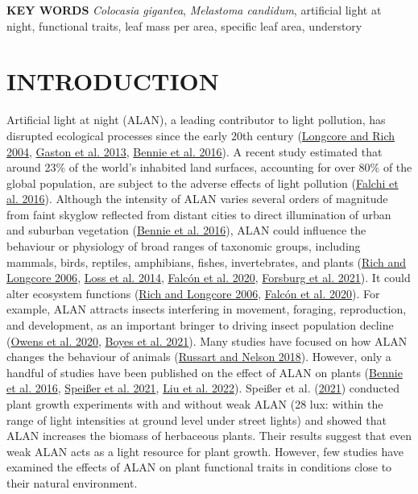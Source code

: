 \documentclass[
  12pt,
  letterpaper,
  DIV=11,
  numbers=noendperiod]{scrartcl}
\begin{document}
\textbf{KEY WORDS} \emph{Colocasia gigantea}, \emph{Melastoma candidum},
artificial light at night, functional traits, leaf mass per area,
specific leaf area, understory

\hypertarget{introduction}{%
\section{INTRODUCTION}\label{introduction}}

Artificial light at night (ALAN), a leading contributor to light
pollution, has disrupted ecological processes since the early 20th
century (\protect\hyperlink{ref-Longcore2004}{Longcore and Rich 2004},
\protect\hyperlink{ref-Gaston2013}{Gaston et al. 2013},
\protect\hyperlink{ref-Bennie2016}{Bennie et al. 2016}). A recent study
estimated that around 23\% of the world's inhabited land surfaces,
accounting for over 80\% of the global population, are subject to the
adverse effects of light pollution
(\protect\hyperlink{ref-Falchi2016a}{Falchi et al. 2016}). Although the
intensity of ALAN varies several orders of magnitude from faint skyglow
reflected from distant cities to direct illumination of urban and
suburban vegetation (\protect\hyperlink{ref-Bennie2016}{Bennie et al.
2016}), ALAN could influence the behaviour or physiology of broad ranges
of taxonomic groups, including mammals, birds, reptiles, amphibians,
fishes, invertebrates, and plants (\protect\hyperlink{ref-Rich2006}{Rich
and Longcore 2006}, \protect\hyperlink{ref-Loss2014}{Loss et al. 2014},
\protect\hyperlink{ref-Falcon2020}{Falcón et al. 2020},
\protect\hyperlink{ref-Forsburg2021}{Forsburg et al. 2021}). It could
alter ecosystem functions (\protect\hyperlink{ref-Rich2006}{Rich and
Longcore 2006}, \protect\hyperlink{ref-Falcon2020}{Falcón et al. 2020}).
For example, ALAN attracts insects interfering in movement, foraging,
reproduction, and development, as an important bringer to driving insect
population decline (\protect\hyperlink{ref-Owens2020}{Owens et al.
2020}, \protect\hyperlink{ref-Boyes2021}{Boyes et al. 2021}). Many
studies have focused on how ALAN changes the behaviour of animals
(\protect\hyperlink{ref-Russart2018}{Russart and Nelson 2018}). However,
only a handful of studies have been published on the effect of ALAN on
plants (\protect\hyperlink{ref-Bennie2016}{Bennie et al. 2016},
\protect\hyperlink{ref-Speisser2021a}{Speißer et al. 2021},
\protect\hyperlink{ref-Liu2022}{Liu et al. 2022}). Speißer et al.
(\protect\hyperlink{ref-Speisser2021a}{2021}) conducted plant growth
experiments with and without weak ALAN (28 lux: within the range of
light intensities at ground level under street lights) and showed that
ALAN increases the biomass of herbaceous plants. Their results suggest
that even weak ALAN acts as a light resource for plant growth. However,
few studies have examined the effects of ALAN on plant functional traits
in conditions close to their natural environment.
\end{document}
